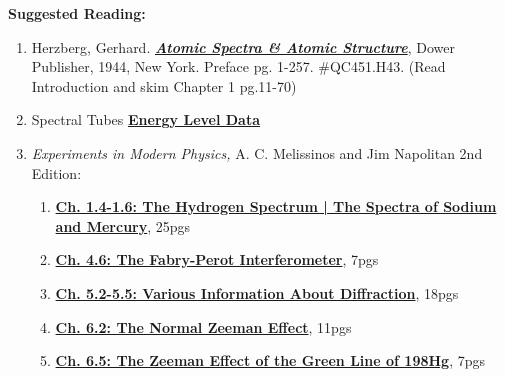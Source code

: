 \documentclass{../lab}
\begin{document}
\noindent\textbf{Suggested Reading:}

\begin{enumerate}
    \item Herzberg, Gerhard. \emph{\href{http://physics111.lib.berkeley.edu/Physics111/Reprints/ATM/02-2ndEd-Atomic\_Spectra\_and\_Atomic\_Structure.pdf}{\textbf{Atomic Spectra \& Atomic Structure}}}, Dower Publisher, 1944, New York. Preface pg. 1-257. \#QC451.H43. (Read Introduction and skim Chapter 1 pg.11-70)

    \item Spectral Tubes \href{http://physics111.lib.berkeley.edu/Physics111/Reprints/ATM/ATM\_index.html}{\textbf{Energy Level Data}}

    \item\emph{Experiments in Modern Physics,} A. C. Melissinos and Jim Napolitan 2nd Edition:
    
    \begin{enumerate}
        \item \href{http://physics111.lib.berkeley.edu/Physics111/Reprints/ATM/Melissinos\_2nd\_2003/ATM\%20OCR\%20melissinos\%202003\%20chapter\%201.4-1.6.pdf}{\textbf{Ch. 1.4-1.6: The Hydrogen Spectrum | The Spectra of Sodium and Mercury}}, 25pgs
    
        \item \href{http://physics111.lib.berkeley.edu/Physics111/Reprints/ATM/Melissinos\_2nd\_2003/ATM\%20OCR\%20melissinos\%202003\%20chapter\%204.6.pdf}{\textbf{Ch. 4.6: The Fabry-Perot Interferometer}}, 7pgs
    
        \item \href{http://physics111.lib.berkeley.edu/Physics111/Reprints/ATM/Melissinos\_2nd\_2003/ATM\%20OCR\%20melissinos\%202003\%20chapter\%205.2-5.5.pdf}{\textbf{Ch. 5.2-5.5: Various Information About Diffraction}}, 18pgs
    
        \item \href{http://physics111.lib.berkeley.edu/Physics111/Reprints/ATM/Melissinos\_2nd\_2003/ATM\%20OCR\%20melissinos\%202003\%20chapter\%206.2.pdf}{\textbf{Ch. 6.2: The Normal Zeeman Effect}}, 11pgs
    
        \item \href{http://physics111.lib.berkeley.edu/Physics111/Reprints/ATM/Melissinos\_2nd\_2003/ATM\%20OCR\%20melissinos\%202003\%20chapter\%206.5.pdf}{\textbf{Ch. 6.5: The Zeeman Effect of the Green Line of 198Hg}}, 7pgs
    
    \end{enumerate}

\end{enumerate}
\end{document}
